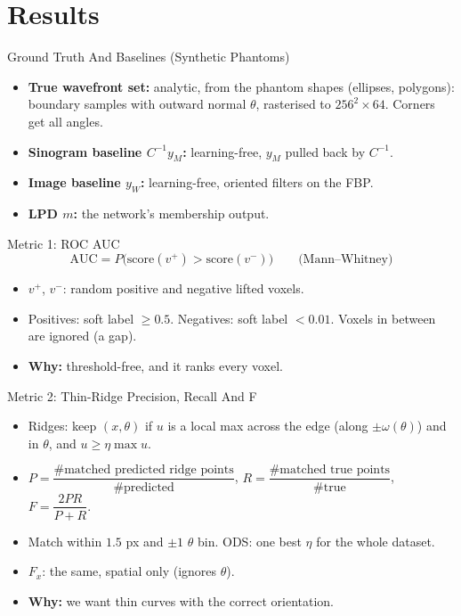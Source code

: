 \documentclass[aspectratio=169]{beamer}
\begin{document}
\section{Results}

\begin{frame}{Ground Truth And Baselines (Synthetic Phantoms)}
  \begin{itemize}
    \item \textbf{True wavefront set:} analytic, from the phantom shapes (ellipses, polygons): boundary samples with outward normal $\theta$, rasterised to $256^2\times64$. Corners get all angles.
    \item \textbf{Sinogram baseline $C^{-1}y_M$:} learning-free, $y_M$ pulled back by $C^{-1}$.
    \item \textbf{Image baseline $y_W$:} learning-free, oriented filters on the FBP.
    \item \textbf{LPD $m$:} the network's membership output.
  \end{itemize}
\end{frame}

\begin{frame}{Metric 1: ROC AUC}
  \[
    \mathrm{AUC}=P\bigl(\text{score}(v^+)>\text{score}(v^-)\bigr)\qquad\text{(Mann--Whitney)}
  \]
  \begin{itemize}
    \item $v^+$, $v^-$: random positive and negative lifted voxels.
    \item Positives: soft label $\ge0.5$. Negatives: soft label $<0.01$. Voxels in between are ignored (a gap).
    \item \textbf{Why:} threshold-free, and it ranks every voxel.
  \end{itemize}
\end{frame}

\begin{frame}{Metric 2: Thin-Ridge Precision, Recall And F}
  \begin{itemize}
    \item Ridges: keep $(x,\theta)$ if $u$ is a local max across the edge (along $\pm\omega(\theta)$) and in $\theta$, and $u\ge\eta\max u$.
    \item $P=\dfrac{\#\text{matched predicted ridge points}}{\#\text{predicted}}$,\quad
          $R=\dfrac{\#\text{matched true points}}{\#\text{true}}$,\quad
          $F=\dfrac{2PR}{P+R}$.
    \item Match within $1.5$ px and $\pm1$ $\theta$ bin. ODS: one best $\eta$ for the whole dataset.
    \item $F_x$: the same, spatial only (ignores $\theta$).
    \item \textbf{Why:} we want thin curves with the correct orientation.
  \end{itemize}
\end{frame}
\end{document}
